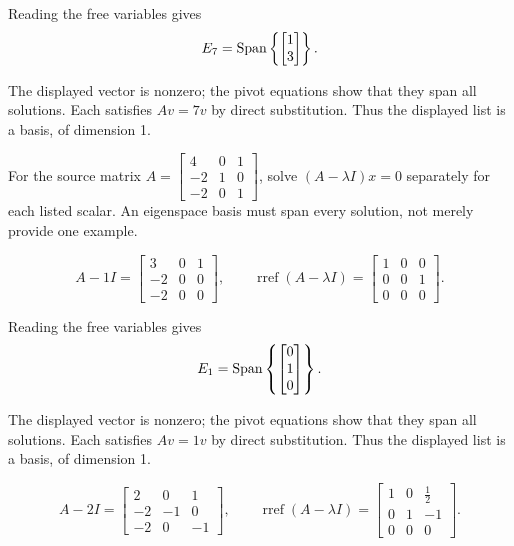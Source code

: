 Reading the free variables gives
\[ E_{7}=\operatorname{Span}\left\{\begin{bmatrix}1\\3\end{bmatrix}\right\}.\]

The displayed vector is nonzero; the pivot equations show that they span all solutions. Each satisfies $Av=7v$ by direct substitution. Thus the displayed list is a basis, of dimension 1.

For the source matrix $A=\begin{bmatrix}4 & 0 & 1\\-2 & 1 & 0\\-2 & 0 & 1\end{bmatrix}$, solve $(A-\lambda I)x=0$ separately for each listed scalar. An eigenspace basis must span every solution, not merely provide one example.

\[ A-1I=\begin{bmatrix}3 & 0 & 1\\-2 & 0 & 0\\-2 & 0 & 0\end{bmatrix},\qquad\operatorname{rref}(A-\lambda I)=\begin{bmatrix}1 & 0 & 0\\0 & 0 & 1\\0 & 0 & 0\end{bmatrix}.\]

Reading the free variables gives
\[ E_{1}=\operatorname{Span}\left\{\begin{bmatrix}0\\1\\0\end{bmatrix}\right\}.\]

The displayed vector is nonzero; the pivot equations show that they span all solutions. Each satisfies $Av=1v$ by direct substitution. Thus the displayed list is a basis, of dimension 1.

\[ A-2I=\begin{bmatrix}2 & 0 & 1\\-2 & -1 & 0\\-2 & 0 & -1\end{bmatrix},\qquad\operatorname{rref}(A-\lambda I)=\begin{bmatrix}1 & 0 & \frac{1}{2}\\0 & 1 & -1\\0 & 0 & 0\end{bmatrix}.\]

